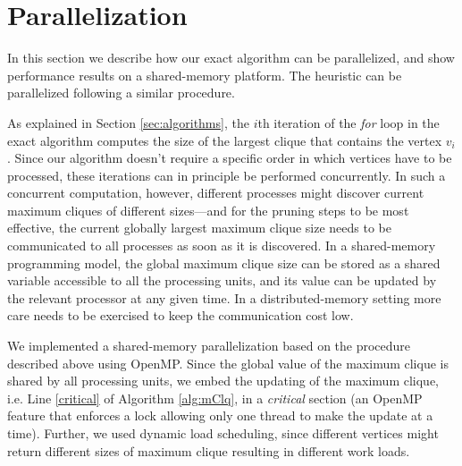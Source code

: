 \section{Parallelization}
\label{sec:parallelization}


In this section we describe how our exact algorithm can be parallelized, and show performance results
on a shared-memory platform. The heuristic can be parallelized following a similar procedure.

As explained in Section \ref{sec:algorithms}, the $i$th iteration of the {\em for} loop in the exact algorithm computes the size of the largest clique that contains the vertex $v_i$. Since our algorithm doesn't require a specific order in which vertices have to be processed, these iterations can in principle be performed concurrently. In such a concurrent computation, however, different processes might discover current maximum cliques of different sizes---and 
for the pruning steps to be most effective, the current globally largest maximum clique size needs to be communicated to all processes as soon as it is discovered. In a shared-memory programming model, the global maximum clique size can be stored as a shared variable accessible to all the processing units, and its value can be updated by the relevant processor at any given time. In a distributed-memory setting more care needs to be exercised to keep the communication cost low. 

We implemented a shared-memory parallelization based on the procedure described above using OpenMP. Since the global value of the maximum clique is shared by all processing units, we embed the updating of the maximum clique, i.e. Line \ref{critical} of Algorithm \ref{alg:mClq}, in a {\it critical} section (an OpenMP feature that enforces a lock allowing only one thread to make the update at a time). Further, we used  dynamic load scheduling, since different vertices might return different sizes of maximum clique resulting in different work loads.

